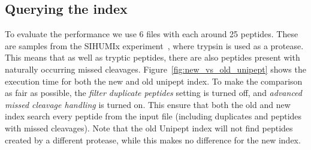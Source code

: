 \documentclass[11pt]{article}
\newenvironment{Figure}
{\par\medskip\noindent\minipage{\linewidth}}
{\endminipage\par\medskip}
\begin{document}
\begin{multicols}{2}
        \subsection{Querying the index} %
        To evaluate the performance we use 6 files with each around 25 peptides.
        These are samples from the SIHUMIx experiment~\cite{SIHUMI_frequently_used, SIHUMI_first_introduction}, where trypsin is used as a protease.
        This means that as well as tryptic peptides, there are also peptides present with naturally occurring missed cleavages.
        Figure~\ref{fig:new_vs_old_unipept} shows the execution time for both the new and old unipept index.
        To make the comparison as fair as possible, the \textit{filter duplicate peptides} setting is turned off, and \textit{advanced missed cleavage handling} is turned on.
        This ensure that both the old and new index search every peptide from the input file (including duplicates and peptides with missed cleavages).
        Note that the old Unipept index will not find peptides created by a different protease, while this makes no difference for the new index.
        \begin{Figure}
            \centering
\end{Figure}
\end{multicols}
\end{document}
